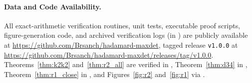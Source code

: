 \documentclass[11pt]{article}
\theoremstyle{remark}
\begin{document}
\paragraph{Data and Code Availability.} All exact-arithmetic verification routines, unit tests, executable proof scripts, figure-generation code, and archived verification logs (in ) are publicly available at \url{https://github.com/Brsanch/hadamard-maxdet}, tagged release \texttt{v1.0.0} at \url{https://github.com/Brsanch/hadamard-maxdet/releases/tag/v1.0.0}. Theorems~\ref{thm:k2k2} and~\ref{thm:r2_all} are verified in , Theorem~\ref{thm:d34} in , Theorem~\ref{thm:r1_close} in , and Figures~\ref{fig:r2} and~\ref{fig:r1} via .
\end{document}
